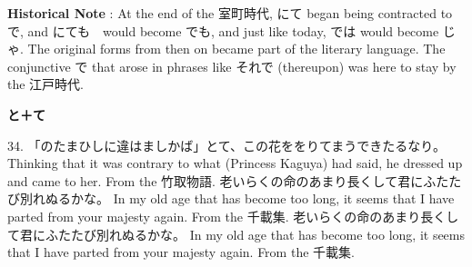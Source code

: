 \par{\textbf{Historical Note }: At the end of the 室町時代, にて began being contracted to で, and にても　would become でも, and just like today, では would become じゃ. The original forms from then on became part of the literary language. The conjunctive で that arose in phrases like それで (thereupon) was here to stay by the 江戸時代. }

\begin{center}
\textbf{と＋て } 
\end{center}

\par{34. 「のたまひしに違はましかば」とて、この花ををりてまうできたるなり。 \hfill\break
Thinking that it was contrary to what (Princess Kaguya) had said, he dressed up and came to her. \hfill\break
From the 竹取物語. }
老いらくの命のあまり長くして君にふたたび別れぬるかな。 \hfill\break
In my old age that has become too long, it seems that I have parted from your majesty again. \hfill\break
From the 千載集. \hfill\break
老いらくの命のあまり長くして君にふたたび別れぬるかな。 \hfill\break
In my old age that has become too long, it seems that I have parted from your majesty again. \hfill\break
From the 千載集. \hfill\break
    